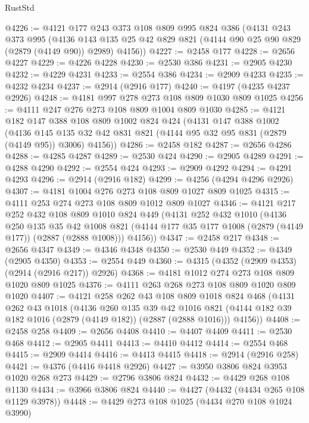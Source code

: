 \begin{lexlean}{RustStd}
\begin{coremodule}
@4226 := @4121
    @177
    @243
    @373
    @108
    @809
    @995
    @824
    @386
    (@4131
      @243
      @373
      @995
      (@4136 @143 @135 @25 @42 @829 @821 (@4144 @90 @25 @90 @829 (@2879 (@4149 @90)) @2989) @4156))
@4227 := @2458 @177
@4228 := @2656 @4227
@4229 := @4226 @4228
@4230 := @2530 @386
@4231 := @2905 @4230
@4232 := @4229 @4231
@4233 := @2554 @386
@4234 := @2909 @4233
@4235 := @4232 @4234
@4237 := @2914 (@2916 @177)
@4240 := @4197 (@4235 @4237 @2926)
@4248 := @4181 @997 @278 @273 @108 @809 @1030 @809 @1025
@4256 := @4111 @247 @276 @273 @108 @809 @1004 @809 @1030
@4285 := @4121
    @182
    @147
    @388
    @108
    @809
    @1002
    @824
    @424
    (@4131
      @147
      @388
      @1002
      (@4136 @145 @135 @32 @42 @831 @821 (@4144 @95 @32 @95 @831 (@2879 (@4149 @95)) @3006) @4156))
@4286 := @2458 @182
@4287 := @2656 @4286
@4288 := @4285 @4287
@4289 := @2530 @424
@4290 := @2905 @4289
@4291 := @4288 @4290
@4292 := @2554 @424
@4293 := @2909 @4292
@4294 := @4291 @4293
@4296 := @2914 (@2916 @182)
@4299 := @4256 (@4294 @4296 @2926)
@4307 := @4181 @1004 @276 @273 @108 @809 @1027 @809 @1025
@4315 := @4111 @253 @274 @273 @108 @809 @1012 @809 @1027
@4346 := @4121
    @217
    @252
    @432
    @108
    @809
    @1010
    @824
    @449
    (@4131
      @252
      @432
      @1010
      (@4136
        @250
        @135
        @35
        @42
        @1008
        @821
        (@4144 @177 @35 @177 @1008 (@2879 (@4149 @177)) (@2887 (@2888 @1008)))
        @4156))
@4347 := @2458 @217
@4348 := @2656 @4347
@4349 := @4346 @4348
@4350 := @2530 @449
@4352 := @4349 (@2905 @4350)
@4353 := @2554 @449
@4360 := @4315 (@4352 (@2909 @4353) (@2914 (@2916 @217)) @2926)
@4368 := @4181 @1012 @274 @273 @108 @809 @1020 @809 @1025
@4376 := @4111 @263 @268 @273 @108 @809 @1020 @809 @1020
@4407 := @4121
    @258
    @262
    @43
    @108
    @809
    @1018
    @824
    @468
    (@4131
      @262
      @43
      @1018
      (@4136
        @260
        @135
        @39
        @42
        @1016
        @821
        (@4144 @182 @39 @182 @1016 (@2879 (@4149 @182)) (@2887 (@2888 @1016)))
        @4156))
@4408 := @2458 @258
@4409 := @2656 @4408
@4410 := @4407 @4409
@4411 := @2530 @468
@4412 := @2905 @4411
@4413 := @4410 @4412
@4414 := @2554 @468
@4415 := @2909 @4414
@4416 := @4413 @4415
@4418 := @2914 (@2916 @258)
@4421 := @4376 (@4416 @4418 @2926)
@4427 := @3950 @3806 @824 @3953 @1020 @268 @273
@4429 := @2796 @3806 @824
@4432 := @4429 @268 @108 @1130
@4434 := @3966 @3806 @824
@4440 := @4427 (@4432 (@4434 @265 @108 @1129 @3978))
@4448 := @4429 @273 @108 @1025 (@4434 @270 @108 @1024 @3990)

\end{coremodule}
\end{lexlean}
